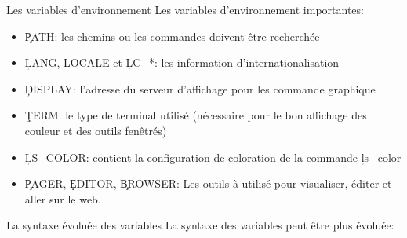 \begin{frame}[fragile=singleslide]{Les variables d'environnement}
  Les variables d'environnement importantes:
  \begin{itemize}
  \item \c{PATH}: les chemins ou les commandes doivent être recherchée
  \item   \c{LANG},    \c{LOCALE}   et   \c{LC_*}:    les   information
    d'internationalisation
  \item  \c{DISPLAY}:  l'adresse  du  serveur  d'affichage  pour  les
    commande graphique
  \item \c{TERM}: le type de  terminal utilisé (nécessaire pour le bon
    affichage des couleur et des outils fenêtrés)
  \item \c{LS_COLOR}:  contient la  configuration de coloration  de la
    commande \c{ls --color}
  \item \c{PAGER}, \c{EDITOR}, \c{BROWSER}:  Les outils à utilisé pour
    visualiser, éditer et aller sur le web.
  \end{itemize}
\end{frame}

\begin{frame}[fragile=singleslide]{La syntaxe évoluée des variables}
  La syntaxe des variables peut être plus évoluée:
\end{frame}

